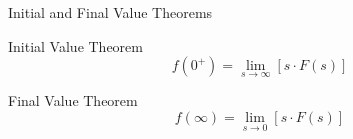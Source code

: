 \documentclass{../templates/mathtool}
\begin{document}
\begin{section}{Initial and Final Value Theorems}
	\begin{subsection}{Initial Value Theorem}
		\begin{equation}
			f(0^+) = \lim_{s\to\infty}[s \cdot F(s)]
		\end{equation}
	\end{subsection}
	
	\begin{subsection}{Final Value Theorem}
		\begin{equation}
			f(\infty) = \lim_{s\to0}[s \cdot F(s)]
		\end{equation}
	\end{subsection}
	
\end{section}
\end{document}

